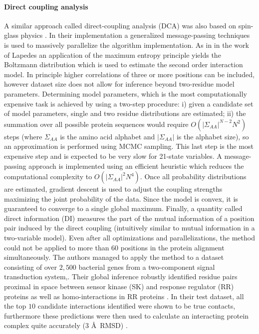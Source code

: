 \paragraph{Direct coupling analysis}
A similar approach called  direct-coupling analysis (DCA) was also based on spin-glass physics \cite{weigt2009identification}.
In their implementation a generalized message-passing techniques is used to massively parallelize the algorithm implementation.
As in in the work of Lapedes \cite{lapedes2012using} an application of the maximum entropy principle yields the Boltzmann distribution which is used to estimate the second order interaction model.
In principle higher correlations of three or more positions can be included, however dataset size does not allow for inference beyond two-residue model parameters. 
Determining model parameters, which is the most computationally expensive task is achieved by using a two-step procedure: 
i) given a candidate set of model parameters, single and two residue distributions are estimated; 
ii) the summation over all possible protein sequences would require $O(|\Sigma_{AA}|^{N-2} N^2)$ steps (where $\Sigma_{AA}$ is the amino acid alphabet and $|\Sigma_{AA}|$ is the alphabet size), so an approximation is performed using MCMC sampling. 
This last step is the most expensive step and is expected to be very slow for 21-state variables.
A message-passing approach is implemented using an efficient heuristic which reduces the computational complexity to $O(|\Sigma_{AA}|^2 N^4)$.
Once all probability distributions are estimated, gradient descent is used to adjust the coupling strengths maximizing the joint probability of the data.
Since the model is convex, it is guaranteed to converge to a single global maximum.
Finally, a quantity called direct information (DI) measures the part of the mutual information of a position pair induced by the direct coupling (intuitively similar to mutual information in a two-variable model).
Even after all optimizations and parallelizations, the method could not be applied to more than $60$ positions in the protein alignment simultaneously.
The authors managed to apply the method to a dataset consisting of over $2,500$ bacterial genes from a two-component signal transduction system,. Their global inference robustly identified residue pairs proximal in space between sensor kinase (SK) and response regulator (RR) proteins as well as homo-interactions in RR proteins \cite{weigt2009identification}.
In their test dataset, all the top $10$ candidate interactions identified were shown to be true contacts, furthermore these predictions were then used to calculate an interacting protein complex quite accurately (3 \AA\  RMSD) \cite{weigt2009identification}.

